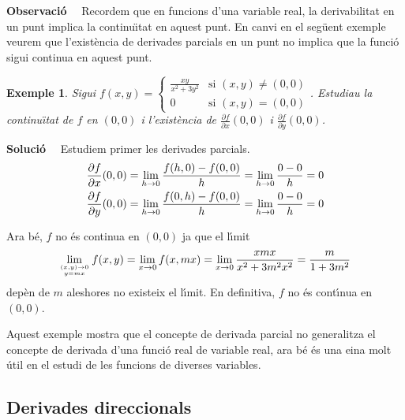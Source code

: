 \documentclass[12pt]{article}
\newcommand{\observacio}{\textbf{Observaci{\'o}}\ \ }
\newcommand{\solucio}{\textbf{Soluci{\'o}}\ \ }
\newtheorem{exemple}{Exemple}[subsection]
\begin{document}
\vspace{0.4cm}
\observacio
Recordem que en funcions d'una variable real, la derivabilitat en un punt implica la
continu{\"\i}tat en aquest punt. En canvi en el seg{\"u}ent exemple veurem que l'exist{\`e}ncia de derivades
parcials en un punt no implica que la funci{\'o} sigui continua en aquest punt.

\vspace{0.4cm}\begin{exemple}
Sigui $f(x,y)=  \begin{cases}
                       \frac{xy}{x^{2}+3y^{2} }&
\text{si} \,\, (x,y) \neq (0,0)
                        \\
                       0                      &
\text{si} \,\, (x,y) = (0,0)
                    \end{cases}$.
Estudiau la continu{\"\i}tat de $f$ en $(0,0)$ i l'exist{\`e}ncia de
$\frac{\partial f}{\partial x}(0,0)$ i $\frac{\partial f}{\partial
y}(0,0)$.
\end{exemple}

\solucio
Estudiem primer les derivades parcials.
\vspace{0.4cm}
\begin{equation*}
\vspace{0.4cm}\begin{split}
\frac{\partial f}{\partial x}(0,0) & = \lim_{h\to 0}
\frac{f(h,0)-f(0,0)}{h} = \lim_{h\to 0} \frac{0-0}{h} = 0 \\
\frac{\partial f}{\partial y}(0,0) & = \lim_{h\to 0}
\frac{f(0,h)-f(0,0)}{h} = \lim_{h\to 0} \frac{0-0}{h} = 0
\end{split}
\end{equation*}

Ara b{\'e}, $f$ no {\'e}s continua en $(0,0)$ ja que el l{\'\i}mit
\vspace{0.4cm}\begin{equation*}
\lim_{(x,y)\to 0\atop y=mx} f(x,y)=\lim_{x\to 0}
f(x,mx)=\lim_{x\to 0}
\frac{xmx}{x^{2}+3m^{2}x^{2}}=\frac{m}{1+3m^{2}}
\end{equation*}
 dep{\`e}n de $m$ aleshores no existeix el l{\'\i}mit. En definitiva, $f$ no {\'e}s cont{\'\i}nua en $(0,0)$.


Aquest exemple mostra que el concepte de derivada
parcial no generalitza el concepte de derivada d'una
funci{\'o} real de variable real, ara b{\'e} {\'e}s una eina molt
{\'u}til en el estudi de les funcions de diverses variables.


\subsection{Derivades direccionals}
\end{document}
